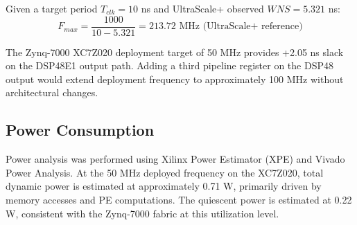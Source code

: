 Given a target period $T_{clk} = 10$ ns and UltraScale+ observed $WNS = 5.321$ ns:
\begin{equation}
F_{max} = \frac{1000}{10 - 5.321} = 213.72 \text{ MHz (UltraScale+ reference)}
\end{equation}

The Zynq-7000 XC7Z020 deployment target of 50 MHz provides +2.05 ns slack on the DSP48E1 output path. Adding a third pipeline register on the DSP48 output would extend deployment frequency to approximately 100 MHz without architectural changes.

\subsection{Power Consumption}
Power analysis was performed using Xilinx Power Estimator (XPE) and Vivado Power Analysis. At the 50 MHz deployed frequency on the XC7Z020, total dynamic power is estimated at approximately 0.71 W, primarily driven by memory accesses and PE computations. The quiescent power is estimated at 0.22 W, consistent with the Zynq-7000 fabric at this utilization level.

